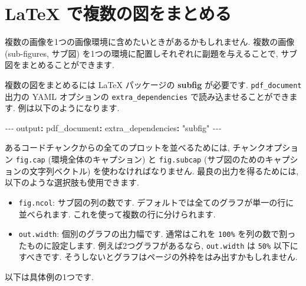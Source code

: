 \documentclass[
  11pt,
  lualatex,ja=standard,jafont=noto]{bxjsreport}
\newenvironment{Shaded}{\begin{snugshade}}{\end{snugshade}}
\newcommand{\AttributeTok}[1]{\textcolor[rgb]{0.77,0.63,0.00}{#1}}
\newcommand{\FunctionTok}[1]{\textcolor[rgb]{0.00,0.00,0.00}{#1}}
\newcommand{\KeywordTok}[1]{\textcolor[rgb]{0.13,0.29,0.53}{\textbf{#1}}}
\newcommand{\PreprocessorTok}[1]{\textcolor[rgb]{0.56,0.35,0.01}{\textit{#1}}}
\newcommand{\StringTok}[1]{\textcolor[rgb]{0.31,0.60,0.02}{#1}}
\begin{document}
\hypertarget{latex-subfigure}{%
\section{LaTeX で複数の図をまとめる}\label{latex-subfigure}}

複数の画像を1つの画像環境に含めたいときがあるかもしれません. 複数の画像 (sub-figures, サブ図) を1つの環境に配置しそれぞれに副題を与えることで, サブ図をまとめることができます.

複数の図をまとめるには LaTeX パッケージの \textbf{subfig} が必要です. \texttt{pdf\_document} 出力の YAML オプションの \texttt{extra\_dependencies} で読み込ませることができます. 例は以下のようになります.

\begin{Shaded}
\begin{Highlighting}[]
\PreprocessorTok{{-}{-}{-}}
\FunctionTok{output}\KeywordTok{:}
\AttributeTok{  }\FunctionTok{pdf\_document}\KeywordTok{:}
\AttributeTok{    }\FunctionTok{extra\_dependencies}\KeywordTok{:}\AttributeTok{ }\StringTok{"subfig"}
\PreprocessorTok{{-}{-}{-}}
\end{Highlighting}
\end{Shaded}

あるコードチャンクからの全てのプロットを並べるためには, チャンクオプション \texttt{fig.cap} (環境全体のキャプション) と \texttt{fig.subcap} (サブ図のためのキャプションの文字列ベクトル) を使わなければなりません. 最良の出力を得るためには, 以下のような選択肢も使用できます.

\begin{itemize}
\item
  \texttt{fig.ncol}: サブ図の列の数です. デフォルトでは全てのグラフが単一の行に並べられます. これを使って複数の行に分けられます.
\item
  \texttt{out.width}: 個別のグラフの出力幅です. 通常はこれを \texttt{100\%} を列の数で割ったものに設定します. 例えば2つグラフがあるなら, \texttt{out.width} は \texttt{50\%} 以下にすべきです. そうしないとグラフはページの外枠をはみ出すかもしれません.
\end{itemize}

以下は具体例の1つです.
\end{document}
